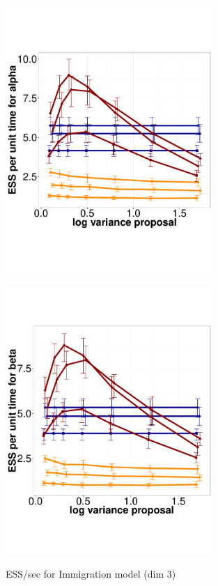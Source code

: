   \begin{figure}%
  \centering
  \begin{minipage}[!hp]{0.45\linewidth}
  \centering
    \includegraphics [width=0.70\textwidth, angle=0]{figs/q_3_alpha.pdf}
      \end{minipage}
  \begin{minipage}[!hp]{0.45\linewidth}
  \centering
    \includegraphics [width=0.70\textwidth, angle=0]{figs/q_3_beta.pdf}
    \vspace{-0 in}
     \label{fig:ESS_Q_3}
  \end{minipage}
    \caption{ESS/sec for Immigration model (dim 3)}
  \end{figure}
